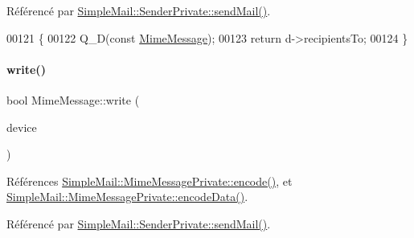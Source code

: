 Référencé par \hyperlink{class_simple_mail_1_1_sender_private_a2ede5284746e77ee37b8fe96f4bbb100}{Simple\+Mail\+::\+Sender\+Private\+::send\+Mail()}.


\begin{DoxyCode}
00121 \{
00122     Q\_D(\textcolor{keyword}{const} \hyperlink{class_simple_mail_1_1_mime_message}{MimeMessage});
00123     \textcolor{keywordflow}{return} d->recipientsTo;
00124 \}
\end{DoxyCode}
\mbox{\label{class_simple_mail_1_1_mime_message_ae7fff977d1c558ddc6711416fe0ff723}} 
\paragraph{\texorpdfstring{write()}{write()}}
{\footnotesize\ttfamily bool Mime\+Message\+::write (\begin{DoxyParamCaption}\item[{Q\+I\+O\+Device $\ast$}]{device }\end{DoxyParamCaption})}



Références \hyperlink{class_simple_mail_1_1_mime_message_private_a44bd454950e1fd6b48a29d2a7b11ca33}{Simple\+Mail\+::\+Mime\+Message\+Private\+::encode()}, et \hyperlink{class_simple_mail_1_1_mime_message_private_ae036b2417205ef25181091bebd15c0f6}{Simple\+Mail\+::\+Mime\+Message\+Private\+::encode\+Data()}.



Référencé par \hyperlink{class_simple_mail_1_1_sender_private_a2ede5284746e77ee37b8fe96f4bbb100}{Simple\+Mail\+::\+Sender\+Private\+::send\+Mail()}.


